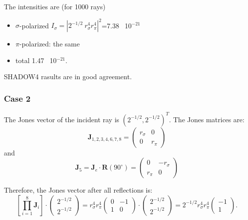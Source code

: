 \documentclass{iucr}
\begin{document}
The intensities are (for 1000 rays)
\begin{itemize}
    \item $\sigma$-polarized $I_\sigma=|2^{-1/2}~r_\sigma^4 r_\pi^4|^2$=7.38~ 10$^{-21}$
    \item $\pi$-polarized: the same 
    \item total 1.47~ 10$^{-21}$.
\end{itemize}
SHADOW4 rasults are in good agreement.

\subsubsection{Case 2}

The Jones vector of the incident ray is $(2^{-1/2},2^{-1/2})^T$.
The Jones matrices are: 
\begin{equation}\label{eq:Jcase2_S4}
\textbf{J}_{1,2,3,4,6,7,8}=
    \begin{pmatrix}
r_\sigma & 0\\
0& 
r_\pi
\end{pmatrix}
\end{equation}
and
\begin{equation}\label{eq:J5case2_S4}
\textbf{J}_{5}=\textbf{J}_e \cdot \textbf{R}(90^\circ)=
\begin{pmatrix}
0 & -r_\sigma\\
r_\pi& 0
\end{pmatrix}
\end{equation}

Therefore, the Jones vector after all reflections is:
\begin{equation}\label{eq:JVcase2_S4}
\left[ \prod_{i=1}^{8} \textbf{J}_i \right]
    \cdot 
    \begin{pmatrix}
    2^{-1/2}\\2^{-1/2}
    \end{pmatrix}=
    r_\sigma^4 r_\pi^4
        \begin{pmatrix}
    0&-1\\
    1 & 0
    \end{pmatrix}
    \cdot
        \begin{pmatrix}
    2^{-1/2}\\2^{-1/2}
    \end{pmatrix}
    =
    2^{-1/2}r_\sigma^4 r_\pi^4
    \begin{pmatrix}
    -1\\
    1
    \end{pmatrix}.
\end{equation}
\end{document}
